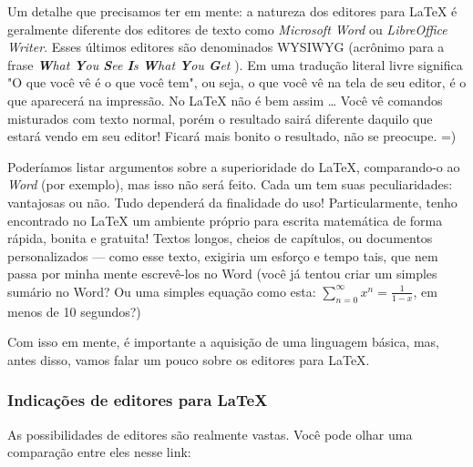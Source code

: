 Um detalhe que precisamos ter em mente: a natureza dos editores para \LaTeX{}
é geralmente diferente dos editores de texto como \textit{Microsoft Word} ou 
\textit{LibreOffice Writer}.
Esses últimos editores são denominados WYSIWYG (acrônimo para a frase 
\textit{
  \textbf{W}hat \textbf{Y}ou \textbf{S}ee \textbf{I}s \textbf{W}hat \textbf{Y}ou \textbf{G}et
}).
Em uma tradução literal livre significa "O que você vê é o que você tem", ou 
seja, o que você vê na tela de seu editor, é o que aparecerá na impressão. 
No \LaTeX{} não é bem assim \ldots 
Você vê comandos misturados com texto normal, porém o resultado sairá diferente 
daquilo que estará vendo em seu editor! 
Ficará mais bonito o resultado, não se preocupe. =)

Poderíamos listar argumentos sobre a superioridade do \LaTeX{}, comparando-o ao 
\textit{Word} (por exemplo), mas isso não será feito. 
Cada um tem suas peculiaridades: vantajosas ou não. 
Tudo dependerá da finalidade do uso!
Particularmente, tenho encontrado no \LaTeX{} um ambiente próprio para escrita 
matemática de forma rápida, bonita e gratuita! 
Textos longos, cheios de capítulos, ou documentos personalizados --- como esse 
texto, exigiria um esforço e tempo tais, que nem passa por minha mente 
escrevê-los no Word (você já tentou criar um simples sumário no Word? 
Ou uma simples equação como esta: $\sum\limits_{n = 0}^{\infty} x^n = \frac{1}{1 - x}$, 
em menos de 10 segundos?)

Com isso em mente, é importante a aquisição de uma linguagem básica, mas, antes 
disso, vamos falar um pouco sobre os editores para \LaTeX.

\subsubsection{Indicações de editores para \LaTeX} %

As possibilidades de editores são realmente vastas.
Você pode olhar uma comparação entre eles nesse link:

